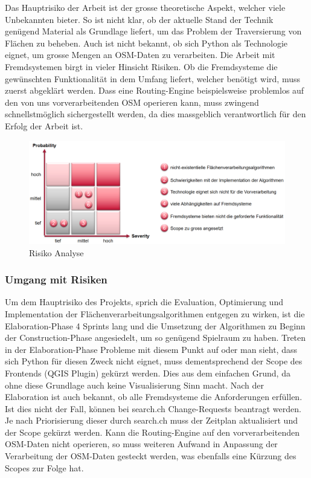 Das Hauptrisiko der Arbeit ist der grosse theoretische Aspekt, welcher viele Unbekannten bieter. So ist nicht klar, ob der aktuelle Stand der Technik genügend Material als Grundlage liefert, um das Problem der Traversierung von Flächen zu beheben. Auch ist nicht bekannt, ob sich Python als Technologie eignet, um grosse Mengen an \ac{OSM}-Daten zu verarbeiten. Die Arbeit mit Fremdsystemen birgt in vieler Hinsicht Risiken. Ob die Fremdsysteme die gewünschten Funktionalität in dem Umfang liefert, welcher benötigt wird, muss zuerst abgeklärt werden. Dass eine Routing-Engine beispielsweise problemlos auf den von uns vorverarbeitenden \ac{OSM} operieren kann, muss zwingend schnellstmöglich sichergestellt werden, da dies massgeblich verantwortlich für den Erfolg der Arbeit ist.

\begin{figure}[ht]
    \centering
    \includegraphics[width=1\linewidth]{projectdoc/img/risk_analysis}
    \caption[Risiko Analyse]{Risiko Analyse}
    \label{fig:risk_analysis}
\end{figure}

\subsubsection{Umgang mit Risiken}
\label{Risiken:Umang mit Risiken}
Um dem Hauptrisiko des Projekts, sprich die Evaluation, Optimierung und Implementation der Flächenverarbeitungsalgorithmen entgegen zu wirken, ist die Elaboration-Phase 4 Sprints lang und die Umsetzung der Algorithmen zu Beginn der Construction-Phase angesiedelt, um so genügend Spielraum zu haben. Treten in der Elaboration-Phase Probleme mit diesem Punkt auf oder man sieht, dass sich Python für diesen Zweck nicht eignet, muss dementsprechend der Scope des Frontends (QGIS Plugin) gekürzt werden. Dies aus dem einfachen Grund, da ohne diese Grundlage auch keine Visualisierung Sinn macht. Nach der Elaboration ist auch bekannt, ob alle Fremdsysteme die Anforderungen erfüllen. Ist dies nicht der Fall, können bei search.ch \cite{search_ch_route_api} Change-Requests beantragt werden. Je nach Priorisierung dieser durch search.ch muss der Zeitplan aktualisiert und der Scope gekürzt werden. Kann die Routing-Engine auf den vorverarbeitenden \ac{OSM}-Daten nicht operieren, so muss weiteren Aufwand in Anpassung der Verarbeitung der \ac{OSM}-Daten gesteckt werden, was ebenfalls eine Kürzung des Scopes zur Folge hat.


